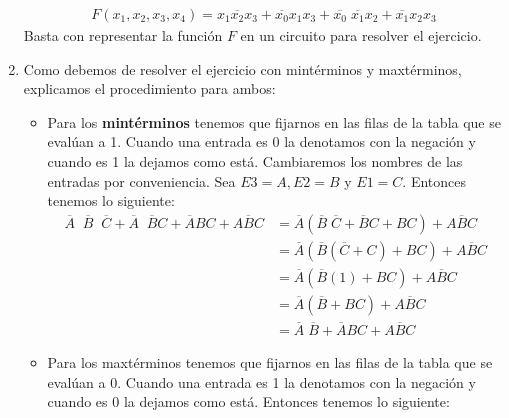 \documentclass[answers]{exam}
\begin{document}
\begin{questions}
\begin{solution}
\begin{enumerate}
            \begin{gather*}
              F(x_{1}, x_{2}, x_{3}, x_{4}) =%
              x_{1}\overline{x_{2}}x_{3} + \overline{x_{0}}x_{1}x_{3} +%
              \overline{x_{0}}\;\overline{x_{1}}x_{2} + \overline{x_{1}}x_{2}x_{3}
            \end{gather*}
            Basta con representar la función $F$ en un circuito para resolver el
            ejercicio.
      \item Como debemos de resolver el ejercicio con mintérminos y maxtérminos,
            explicamos el procedimiento para ambos:
            \begin{itemize}
              \item Para los \textbf{mintérminos} tenemos que fijarnos en las filas de
                    la tabla que se evalúan a 1. Cuando una entrada es 0 la
                    denotamos con la negación y cuando es 1 la dejamos como
                    está. Cambiaremos los nombres de las entradas por
                    conveniencia. Sea $E3 = A, E2 = B$ y $E1 = C$. Entonces tenemos
                    lo siguiente:
                    \begin{align*}
                      \overline{A}\;\;\overline{B}\;\;\overline{C} +%
                      \overline{A}\;\;\overline{B}C + \overline{A}BC + A\overline{B}C
                      &= \overline{A}(\overline{B}\;\overline{C} + \overline{B}C + BC)%
                        + A\overline{B}C \tag{por distributividad} \\
                      &= \overline{A}(\overline{B}(\overline{C} + C) + BC)%
                        + A\overline{B}C \tag{por distributividad} \\
                      &= \overline{A}(\overline{B} (1) + BC)%
                        + A\overline{B}C \tag{por complemento} \\
                      &= \overline{A}(\overline{B} + BC)%
                        + A\overline{B}C \tag{por identidad} \\
                      &= \overline{A}\;\overline{B} + \overline{A}BC%
                        + A\overline{B}C \tag{por distributividad}
                    \end{align*}
              \item Para los maxtérminos tenemos que fijarnos en las filas de
                    la tabla que se evalúan a 0. Cuando una entrada es 1 la
                    denotamos con la negación y cuando es 0 la dejamos como
                    está. Entonces tenemos lo siguiente:

\end{itemize}
\end{enumerate}
\end{solution}
\end{questions}
\end{document}
